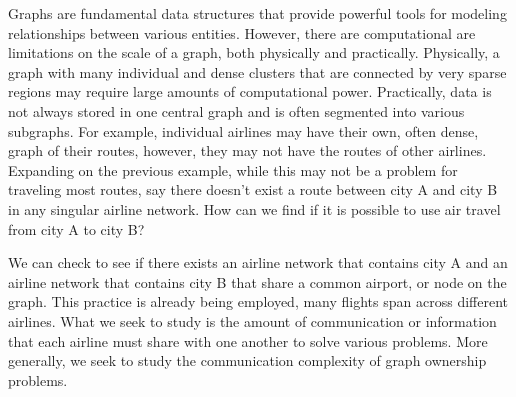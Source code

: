 \documentclass[12pt,letterpaper]{article}
\begin{document}
Graphs are fundamental data structures that provide powerful tools for modeling relationships between various entities. However, there are computational are limitations on the scale of a graph, both physically and practically. Physically, a graph with many individual and dense clusters that are connected by very sparse regions may require large amounts of computational power. Practically, data is not always stored in one central graph and is often segmented into various subgraphs. For example, individual airlines may have their own, often dense, graph of their routes, however, they may not have the routes of other airlines.  Expanding on the previous example, while this may not be a problem for traveling most routes, say there doesn’t exist a route between city A and city B in any singular airline network. How can we find if it is possible to use air travel from city A to city B?


We can check to see if there exists an airline network that contains city A and an airline network that contains city B that share a common airport, or node on the graph. This practice is already being employed, many flights span across different airlines. What we seek to study is the amount of communication or information that each airline must share with one another to solve various problems. More generally, we seek to study the communication complexity of graph ownership problems.
\end{document}
